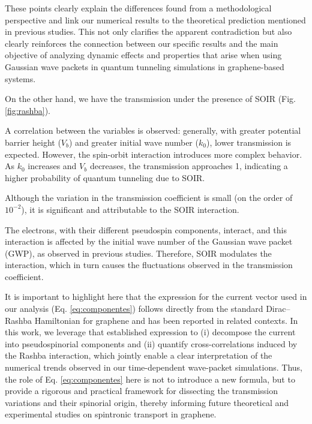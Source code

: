 These points clearly explain the differences found from a methodological perspective and link our numerical results to the theoretical prediction mentioned in previous studies.
This not only clarifies the apparent contradiction but also clearly reinforces the connection between our specific results and the main objective of analyzing dynamic effects and properties that arise when using Gaussian wave packets in quantum tunneling simulations in graphene-based systems.

On the other hand, we have the transmission under the presence of SOIR (Fig.\ref{fig:rashba}).

A correlation between the variables is observed: generally, with greater potential barrier height ($V_b$) and greater initial wave number ($k_0$), lower transmission is expected.
However, the spin-orbit interaction introduces more complex behavior.
As $k_0$ increases and $V_b$ decreases, the transmission approaches 1, indicating a higher probability of quantum tunneling due to SOIR\@.

Although the variation in the transmission coefficient is small (on the order of $10^{-2}$), it is significant and attributable to the SOIR interaction.

The electrons, with their different pseudospin components, interact, and this interaction is affected by the initial wave number of the Gaussian wave packet (GWP), as observed in previous studies\cite{Serna2019}.
Therefore, SOIR modulates the interaction, which in turn causes the fluctuations observed in the transmission coefficient.

It is important to highlight here that the expression for the current vector used in our analysis (Eq. \ref{eq:componentes}) follows directly from the standard Dirac–Rashba Hamiltonian for graphene and has been reported in related contexts\cite{AvishaiPhysRevB2021}.
In this work, we leverage that established expression to (i) decompose the current into pseudospinorial components and (ii) quantify cross-correlations induced by the Rashba interaction, which jointly enable a clear interpretation of the numerical trends observed in our time-dependent wave-packet simulations.
Thus, the role of Eq. \ref{eq:componentes} here is not to introduce a new formula, but to provide a rigorous and practical framework for dissecting the transmission variations and their spinorial origin\cite{Serna2019}, thereby informing future theoretical and experimental studies on spintronic transport in graphene.

